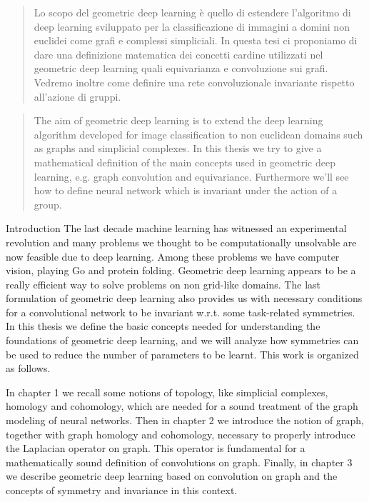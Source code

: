 \documentclass[12pt,a4paper,twoside]{report}
\theoremstyle{plain}
\theoremstyle{definition}
\theoremstyle{remark}
\begin{document}
    \begin{titlepage}
        
    \end{titlepage}
    \begin{abstract}
        Lo scopo del geometric deep learning è quello di estendere l'algoritmo di deep learning sviluppato per la classificazione di immagini a domini
        non euclidei come grafi e complessi simpliciali.
        In questa tesi ci proponiamo di dare una definizione matematica dei concetti cardine utilizzati nel geometric deep learning quali equivarianza e convoluzione sui grafi.
        Vedremo inoltre come definire una rete convoluzionale invariante rispetto all'azione di gruppi.
    \end{abstract}
    \begin{abstract}
        The aim of geometric deep learning is to extend the deep learning algorithm developed for image classification to non euclidean domains such as graphs
        and simplicial complexes.
        In this thesis we try to give a mathematical definition of the main concepts used in geometric deep learning, e.g. graph convolution and equivariance.
        Furthermore we'll see how to define neural network which is invariant under the action of a group.
    \end{abstract}
    \tableofcontents
    \newpage
    \begin{chapter}{Introduction}
        The last decade machine learning has witnessed an experimental revolution and
        many problems we thought to be computationally unsolvable are now feasible due to deep learning.
        Among these problems we have computer vision, playing Go and protein folding.
        Geometric deep learning appears to be a really efficient way to solve problems on non grid-like domains.
        The last formulation of geometric deep learning also provides us with necessary conditions for a convolutional
        network to be invariant w.r.t. some task-related symmetries.
        In this thesis we define the basic concepts needed for understanding the foundations of geometric deep learning,
        and we will analyze how symmetries can be used to reduce the number of parameters to be learnt.
        \medskip
        This work is organized as follows.

        \medskip
        In chapter 1 we recall some notions of topology, like
        simplicial complexes, homology and cohomology, which are needed
        for a sound treatment of the graph modeling of neural networks.
        Then in chapter 2 we introduce the notion of graph, together
        with graph homology and cohomology, necessary to properly
        introduce the Laplacian operator on graph. This operator
        is fundamental for a mathematically sound definition of convolutions on
        graph.
        Finally, in chapter 3 we describe geometric deep learning
        based on convolution on graph and the concepts of symmetry
        and invariance in this context.
    \end{chapter}
\end{document}
